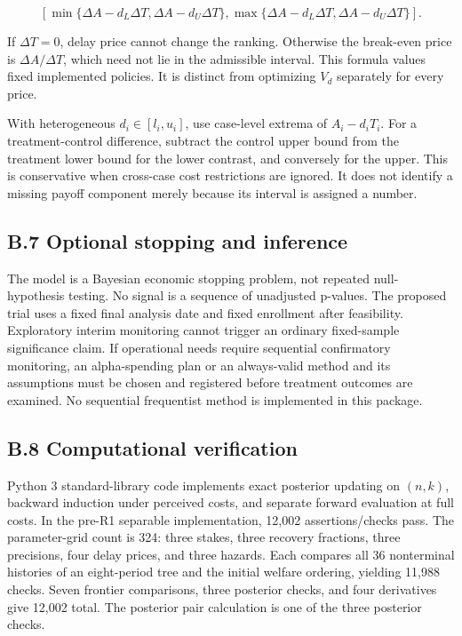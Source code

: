 \documentclass[
  11pt,
]{article}
\begin{document}
\[[\min\{\Delta A-d_L\Delta T,\Delta A-d_U\Delta T\},
\max\{\Delta A-d_L\Delta T,\Delta A-d_U\Delta T\}].\]

If \(\Delta T=0\), delay price cannot change the ranking. Otherwise the
break-even price is \(\Delta A/\Delta T\), which need not lie in the
admissible interval. This formula values fixed implemented policies. It
is distinct from optimizing \(V_d\) separately for every price.

With heterogeneous \(d_i\in[l_i,u_i]\), use case-level extrema of
\(A_i-d_iT_i\). For a treatment-control difference, subtract the control
upper bound from the treatment lower bound for the lower contrast, and
conversely for the upper. This is conservative when cross-case cost
restrictions are ignored. It does not identify a missing payoff
component merely because its interval is assigned a number.

\subsection{B.7 Optional stopping and
inference}\label{b.7-optional-stopping-and-inference}

The model is a Bayesian economic stopping problem, not repeated
null-hypothesis testing. No signal is a sequence of unadjusted p-values.
The proposed trial uses a fixed final analysis date and fixed enrollment
after feasibility. Exploratory interim monitoring cannot trigger an
ordinary fixed-sample significance claim. If operational needs require
sequential confirmatory monitoring, an alpha-spending plan or an
always-valid method and its assumptions must be chosen and registered
before treatment outcomes are examined. No sequential frequentist method
is implemented in this package.

\subsection{B.8 Computational
verification}\label{b.8-computational-verification}

Python 3 standard-library code implements exact posterior updating on
\((n,k)\), backward induction under perceived costs, and separate
forward evaluation at full costs. In the pre-R1 separable
implementation, 12,002 assertions/checks pass. The parameter-grid count
is 324: three stakes, three recovery fractions, three precisions, four
delay prices, and three hazards. Each compares all 36 nonterminal
histories of an eight-period tree and the initial welfare ordering,
yielding 11,988 checks. Seven frontier comparisons, three posterior
checks, and four derivatives give 12,002 total. The posterior pair
calculation is one of the three posterior checks.
\end{document}

